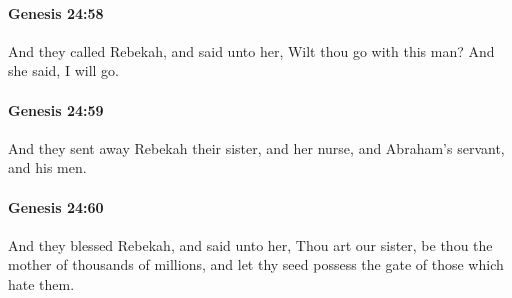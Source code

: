 		\paragraph{Genesis 24:58} %
			\label{GENESIS-24-58}

			And they called Rebekah, and said unto her, Wilt thou go with this man?  And she said, I will go.


		\paragraph{Genesis 24:59} %
			\label{GENESIS-24-59}

			And they sent away Rebekah their sister, and her nurse, and Abraham's servant, and his men.


		\paragraph{Genesis 24:60} %
			\label{GENESIS-24-60}

			And they blessed Rebekah, and said unto her, Thou art our sister, be thou the mother of thousands of millions, and let thy seed possess the gate of those which hate them.


